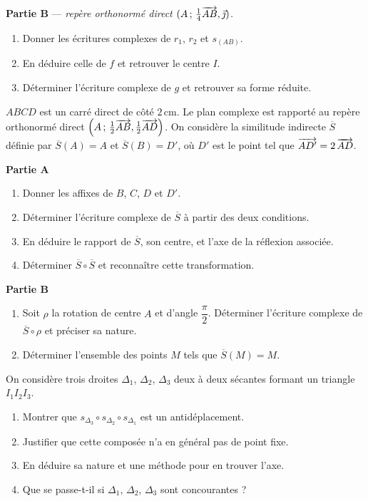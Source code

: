 \textbf{Partie B} — \textit{repère orthonormé direct
$(A\,;\,\frac14\overrightarrow{AB},\vec{\jmath})$.}
\begin{enumerate}
	\item Donner les écritures complexes de $r_1$, $r_2$ et $s_{(AB)}$.
	\item En déduire celle de $f$ et retrouver le centre $I$.
	\item Déterminer l'écriture complexe de $g$ et retrouver sa forme réduite.
\end{enumerate}

$ABCD$ est un carré direct de côté $2\,$cm. Le plan complexe est rapporté au
repère orthonormé direct $\left(A\,;\,\frac12\overrightarrow{AB},\frac12\overrightarrow{AD}\right)$.
On considère la similitude indirecte $\overline S$ définie par
$\overline S(A) = A$ et $\overline S(B) = D'$, où $D'$ est le point tel que
$\overrightarrow{AD'} = 2\,\overrightarrow{AD}$.

\textbf{Partie A}
\begin{enumerate}
	\item Donner les affixes de $B$, $C$, $D$ et $D'$.
	\item Déterminer l'écriture complexe de $\overline S$ à partir des deux
	conditions.
	\item En déduire le rapport de $\overline S$, son centre, et l'axe de la
	réflexion associée.
	\item Déterminer $\overline S\circ\overline S$ et reconnaître cette
	transformation.
\end{enumerate}

\textbf{Partie B}
\begin{enumerate}
	\item Soit $\rho$ la rotation de centre $A$ et d'angle $\dfrac{\pi}{2}$.
	Déterminer l'écriture complexe de $\overline S\circ\rho$ et préciser sa
	nature.
	\item Déterminer l'ensemble des points $M$ tels que $\overline S(M) = M$.
\end{enumerate}

On considère trois droites $\Delta_1$, $\Delta_2$, $\Delta_3$ deux à deux
sécantes formant un triangle $I_1 I_2 I_3$.
\begin{enumerate}
	\item Montrer que $s_{\Delta_3}\circ s_{\Delta_2}\circ s_{\Delta_1}$ est un
	antidéplacement.
	\item Justifier que cette composée n'a en général pas de point fixe.
	\item En déduire sa nature et une méthode pour en trouver l'axe.
	\item Que se passe-t-il si $\Delta_1$, $\Delta_2$, $\Delta_3$ sont
	concourantes ?
\end{enumerate}

